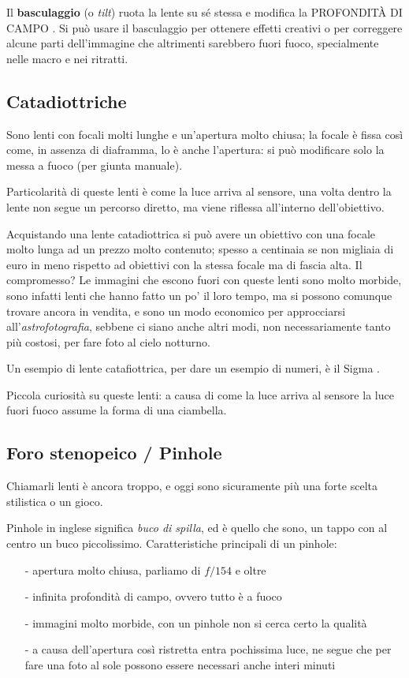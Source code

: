 Il \textbf{basculaggio} (o \textit{tilt}) ruota la lente su sé stessa e modifica la PROFONDITÀ DI CAMPO .
Si può usare il basculaggio per ottenere effetti creativi o per correggere alcune parti dell'immagine che altrimenti sarebbero fuori fuoco, specialmente nelle macro e nei ritratti.


\subsection{Catadiottriche} \label{subsec:lenticatadiottriche}
Sono lenti con focali molti lunghe e un'apertura molto chiusa; la focale è fissa così come, in assenza di diaframma, lo è anche l'apertura: si può modificare solo la messa a fuoco (per giunta manuale).

Particolarità di queste lenti è come la luce arriva al sensore, una volta dentro la lente non segue un percorso diretto, ma viene riflessa all'interno dell'obiettivo.

Acquistando una lente catadiottrica si può avere un obiettivo con una focale molto lunga ad un prezzo molto contenuto; spesso a centinaia se non migliaia di euro in meno rispetto ad obiettivi con la stessa focale ma di fascia alta.
Il compromesso? Le immagini che escono fuori con queste lenti sono molto morbide, sono infatti lenti che hanno fatto un po' il loro tempo, ma si possono comunque trovare ancora in vendita, e sono un modo economico per approcciarsi all'\textit{astrofotografia}, sebbene ci siano anche altri modi, non necessariamente tanto più costosi, per fare foto al cielo notturno.

Un esempio di lente catafiottrica, per dare un esempio di numeri, è il Sigma .

Piccola curiosità su queste lenti: a causa di come la luce arriva al sensore la luce fuori fuoco assume la forma di una ciambella.


\subsection{Foro stenopeico / Pinhole} \label{subsec:lentipinhole}
Chiamarli lenti è ancora troppo, e oggi sono sicuramente più una forte scelta stilistica o un gioco.

Pinhole in inglese significa \textit{buco di spilla}, ed è quello che sono, un tappo con al centro un buco piccolissimo.\newline
Caratteristiche principali di un pinhole:
\begin{itemize}
    \item[-] apertura molto chiusa, parliamo di $f/154$ e oltre
    \item[-] infinita profondità di campo, ovvero tutto è a fuoco
    \item[-] immagini molto morbide, con un pinhole non si cerca certo la qualità
    \item[-] a causa dell'apertura così ristretta entra pochissima luce, ne segue che per fare una foto al sole possono essere necessari anche interi minuti   
\end{itemize}

